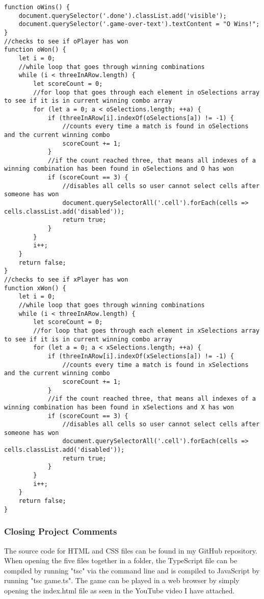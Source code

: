 \documentclass{article}
\theoremstyle{theorem}
\theoremstyle{definition}
\theoremstyle{remark}
\begin{document}
\begin{lstlisting}
function oWins() {
    document.querySelector('.done').classList.add('visible');
    document.querySelector('.game-over-text').textContent = "O Wins!";
}
//checks to see if oPlayer has won
function oWon() {
    let i = 0;
    //while loop that goes through winning combinations
    while (i < threeInARow.length) {
        let scoreCount = 0;
        //for loop that goes through each element in oSelections array to see if it is in current winning combo array
        for (let a = 0; a < oSelections.length; ++a) {
            if (threeInARow[i].indexOf(oSelections[a]) != -1) {
                //counts every time a match is found in oSelections and the current winning combo
                scoreCount += 1;
            }
            //if the count reached three, that means all indexes of a winning combination has been found in oSelections and O has won
            if (scoreCount == 3) {
                //disables all cells so user cannot select cells after someone has won
                document.querySelectorAll('.cell').forEach(cells => cells.classList.add('disabled'));
                return true;
            }
        }
        i++;
    }
    return false;
}
//checks to see if xPlayer has won
function xWon() {
    let i = 0;
    //while loop that goes through winning combinations
    while (i < threeInARow.length) {
        let scoreCount = 0;
        //for loop that goes through each element in xSelections array to see if it is in current winning combo array
        for (let a = 0; a < xSelections.length; ++a) {
            if (threeInARow[i].indexOf(xSelections[a]) != -1) {
                //counts every time a match is found in xSelections and the current winning combo
                scoreCount += 1;
            }
            //if the count reached three, that means all indexes of a winning combination has been found in xSelections and X has won
            if (scoreCount == 3) {
                //disables all cells so user cannot select cells after someone has won
                document.querySelectorAll('.cell').forEach(cells => cells.classList.add('disabled'));
                return true;
            }
        }
        i++;
    }
    return false;
}
\end{lstlisting}

\subsubsection{Closing Project Comments}
The source code for HTML and CSS files can be found in my GitHub repository. When opening the five files together in a folder, the TypeScript file can be compiled by running "tsc" via the command line and is compiled to JavaScript by running "tsc game.ts". The game can be played in a web browser by simply opening the index.html file as seen in the YouTube video I have attached. \cite{Final Project Demo Video}
\end{document}
